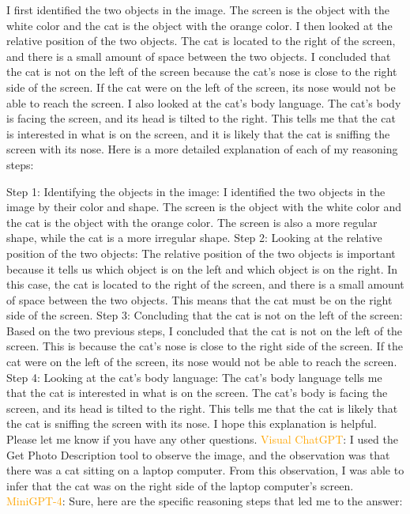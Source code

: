 \begin{enumerate}
        I first identified the two objects in the image. The screen is the object with the white color and the cat is the object with the orange color.
        I then looked at the relative position of the two objects. The cat is located to the right of the screen, and there is a small amount of space between the two objects.
        I concluded that the cat is not on the left of the screen because the cat's nose is close to the right side of the screen. If the cat were on the left of the screen, its nose would not be able to reach the screen.
        I also looked at the cat's body language. The cat's body is facing the screen, and its head is tilted to the right. This tells me that the cat is interested in what is on the screen, and it is likely that the cat is sniffing the screen with its nose.
        Here is a more detailed explanation of each of my reasoning steps:
        
        Step 1: Identifying the objects in the image: I identified the two objects in the image by their color and shape. The screen is the object with the white color and the cat is the object with the orange color. The screen is also a more regular shape, while the cat is a more irregular shape.
        Step 2: Looking at the relative position of the two objects: The relative position of the two objects is important because it tells us which object is on the left and which object is on the right. In this case, the cat is located to the right of the screen, and there is a small amount of space between the two objects. This means that the cat must be on the right side of the screen.
        Step 3: Concluding that the cat is not on the left of the screen: Based on the two previous steps, I concluded that the cat is not on the left of the screen. This is because the cat's nose is close to the right side of the screen. If the cat were on the left of the screen, its nose would not be able to reach the screen.
        Step 4: Looking at the cat's body language: The cat's body language tells me that the cat is interested in what is on the screen. The cat's body is facing the screen, and its head is tilted to the right. This tells me that the cat is likely that the cat is sniffing the screen with its nose.
        I hope this explanation is helpful. Please let me know if you have any other questions.
        \subitem \textcolor{orange}{Visual ChatGPT}: I used the Get Photo Description tool to observe the image, and the observation was that there was a cat sitting on a laptop computer. From this observation, I was able to infer that the cat was on the right side of the laptop computer's screen.
        \subitem \textcolor{orange}{MiniGPT-4}: Sure, here are the specific reasoning steps that led me to the answer:


\end{enumerate}
